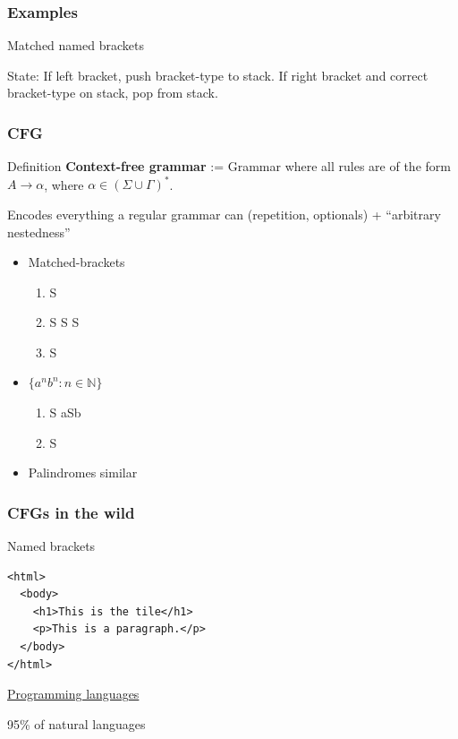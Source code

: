 \documentclass[languages_and_machines.tex]{subfiles}
\begin{document}
\begin{frame}
  \frametitle{Examples}
  Matched named brackets
  \pause

  State: If left bracket, push bracket-type to stack. If right bracket and correct bracket-type on stack, pop from stack.
\end{frame}

\begin{frame}
  \frametitle{CFG}

  \begin{block}{Definition}
    \textbf{Context-free grammar} := Grammar where all rules are of the form \(A \to \alpha\), where \(\alpha \in (\Sigma \cup \Gamma)^*\).
  \end{block}

  Encodes everything a regular grammar can (repetition, optionals) + ``arbitrary nestedness''

  \begin{itemize}
    \item Matched-brackets
    \pause
      \begin{enumerate}
      \item S \pro [~S~]
      \item S \pro S S
      \item S \pro \emptystr
      \end{enumerate}
    \item \(\{a^nb^n : n \in \mathbb N\}\)
    \pause
      \begin{enumerate}
      \item S \pro aSb
      \item S \pro \emptystr
      \end{enumerate}
    \item Palindromes similar
    \end{itemize}
\end{frame}

\begin{frame}[fragile]
  \frametitle{CFGs in the wild}

  Named brackets

  \pause

\begin{verbatim}
<html>
  <body>
    <h1>This is the tile</h1>
    <p>This is a paragraph.</p>
  </body>
</html>
\end{verbatim}

  \pause

  \href{https://docs.python.org/3/reference/compound_stmts.html}{Programming languages}

  \pause

  95\% of natural languages
\end{frame}
\end{document}
